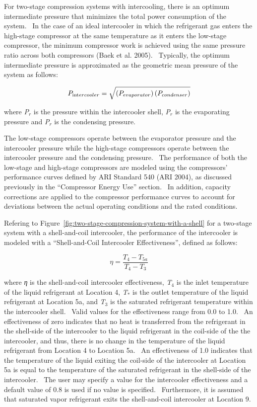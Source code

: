 For two-stage compression systems with intercooling, there is an optimum intermediate pressure that minimizes the total power consumption of the system.~ In the case of an ideal intercooler in which the refrigerant gas enters the high-stage compressor at the same temperature as it enters the low-stage compressor, the minimum compressor work is achieved using the same pressure ratio across both compressors (Baek et al. 2005).~ Typically, the optimum intermediate pressure is approximated as the geometric mean pressure of the system as follows:

\begin{equation}
{P_{{\mathop{\rm int}} ercooler}} = \sqrt {\left( {{P_{evaporator}}} \right)\left( {{P_{condenser}}} \right)}
\end{equation}

where \emph{P\(_{r}\)} is the pressure within the intercooler shell, \emph{P\(_{r}\)} is the evaporating pressure and \emph{P\(_{r}\)} is the condensing pressure.

The low-stage compressors operate between the evaporator pressure and the intercooler pressure while the high-stage compressors operate between the intercooler pressure and the condensing pressure.~ The performance of both the low-stage and high-stage compressors are modeled using the compressors' performance curves defined by ARI Standard 540 (ARI 2004), as discussed previously in the ``Compressor Energy Use'' section.~ In addition, capacity corrections are applied to the compressor performance curves to account for deviations between the actual operating conditions and the rated conditions.

Refering to Figure~\ref{fig:two-stage-compression-system-with-a-shell} for a two-stage system with a shell-and-coil intercooler, the performance of the intercooler is modeled with a ``Shell-and-Coil Intercooler Effectiveness'', defined as follows:

\begin{equation}
\eta  = \frac{{{T_4} - {T_{5a}}}}{{{T_4} - {T_3}}}
\end{equation}

where \emph{η} is the shell-and-coil intercooler effectiveness, \emph{T}\(_{4}\) is the inlet temperature of the liquid refrigerant at Location 4, \emph{T}\(_{*}\) is the outlet temperature of the liquid refrigerant at Location 5a, and \emph{T}\(_{3}\) is the saturated refrigerant temperature within the intercooler shell.~ Valid values for the effectiveness range from 0.0 to 1.0.~ An effectiveness of zero indicates that no heat is transferred from the refrigerant in the shell-side of the intercooler to the liquid refrigerant in the coil-side of the the intercooler, and thus, there is no change in the temperature of the liquid refrigerant from Location 4 to Location 5a.~ An effectiveness of 1.0 indicates that the temperature of the liquid exiting the coil-side of the intercooler at Location 5a is equal to the temperature of the saturated refrigerant in the shell-side of the intercooler.~ The user may specify a value for the intercooler effectiveness and a default value of 0.8 is used if no value is specified.~ Furthermore, it is assumed that saturated vapor refrigerant exits the shell-and-coil intercooler at Location 9.

